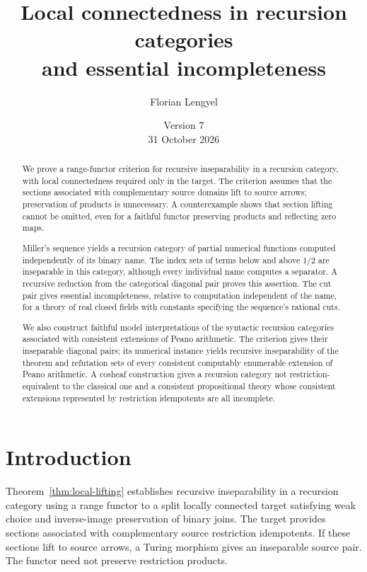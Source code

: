 \documentclass[11pt]{article}
\title{Local connectedness in recursion categories\\
and essential incompleteness}
\author{Florian Lengyel}
\date{Version 7\\31 October 2026}
\begin{document}
\maketitle

\begin{abstract}
We prove a range-functor criterion for recursive inseparability in a
recursion category, with local connectedness required only in the target.
The criterion assumes that the sections associated with complementary
source domains lift to source arrows; preservation of products is
unnecessary. A counterexample
shows that section lifting cannot be omitted, even for a faithful functor
preserving products and reflecting zero maps.

Miller's sequence yields a recursion category of partial numerical
functions computed independently of its binary name. The index sets of
terms below and above $1/2$ are inseparable in this category, although
every individual name computes a separator. A recursive reduction from
the categorical diagonal pair proves this assertion. The cut pair
gives essential incompleteness, relative to computation independent of
the name, for a theory of real closed fields with constants specifying
the sequence's rational cuts.

We also construct faithful model interpretations of the syntactic
recursion categories associated with consistent extensions of Peano
arithmetic. The criterion gives their inseparable diagonal pairs; its
numerical instance yields recursive inseparability of the theorem and
refutation sets of every consistent computably enumerable extension of
Peano arithmetic. A cosheaf construction gives a recursion category
not restriction-equivalent to the classical one and a consistent
propositional theory whose consistent
extensions represented by restriction idempotents are all incomplete.
\end{abstract}

\section{Introduction}

Theorem~\ref{thm:local-lifting} establishes recursive inseparability
in a recursion category using a range functor to a split locally
connected target satisfying weak choice and inverse-image preservation
of binary joins. The target provides sections associated with
complementary source restriction idempotents. If these sections lift
to source arrows, a Turing morphism gives an inseparable source pair.
The functor need not preserve restriction products.
\end{document}
